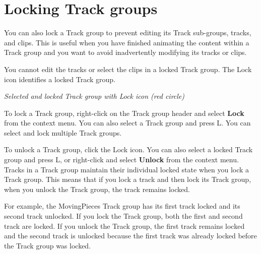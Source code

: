 \chapter{Locking Track groups}
\hypertarget{md__hey_tea_9_2_library_2_package_cache_2com_8unity_8timeline_0d1_87_85_2_documentation_0i_2grp__lock}{}\label{md__hey_tea_9_2_library_2_package_cache_2com_8unity_8timeline_0d1_87_85_2_documentation_0i_2grp__lock}
\label{md__hey_tea_9_2_library_2_package_cache_2com_8unity_8timeline_0d1_87_85_2_documentation_0i_2grp__lock_autotoc_md4643}%
%
 You can also lock a Track group to prevent editing its Track sub-\/groups, tracks, and clips. This is useful when you have finished animating the content within a Track group and you want to avoid inadvertently modifying its tracks or clips.

You cannot edit the tracks or select the clips in a locked Track group. The Lock icon identifies a locked Track group.



{\itshape Selected and locked Track group with Lock icon (red circle)}

To lock a Track group, right-\/click on the Track group header and select {\bfseries{Lock}} from the context menu. You can also select a Track group and press L. You can select and lock multiple Track groups.

To unlock a Track group, click the Lock icon. You can also select a locked Track group and press L, or right-\/click and select {\bfseries{Unlock}} from the context menu. Tracks in a Track group maintain their individual locked state when you lock a Track group. This means that if you lock a track and then lock its Track group, when you unlock the Track group, the track remains locked.

For example, the Moving\+Pieces Track group has its first track locked and its second track unlocked. If you lock the Track group, both the first and second track are locked. If you unlock the Track group, the first track remains locked and the second track is unlocked because the first track was already locked before the Track group was locked. 